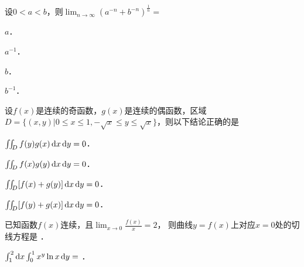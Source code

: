 \documentclass[plain,noanswer,medmath]{../../template/jnuexam}
\begin{document}






\begin{problem}
设$0 < a < b$，则$\lim_{n\to\infty}\left(a^{-n} + b^{-n}\right)^{\frac{1}{n}}=$\pickout{}
\begin{abcd}
\item $a$．
\item $a^{-1}$．
\item $b$．
\item $b^{-1}$．
\end{abcd}
\end{problem}




\begin{problem}
设$f(x)$是连续的奇函数，$g(x)$是连续的偶函数，区域\goodbreak
$D = \{(x,y)|0 \le x \le 1, - \sqrt{x} \le y \le \sqrt{x}\}$，则以下结论正确的是\pickout{}
\begin{abcd}
\item $\iint_D f(y)g(x)\mathop{}\!\mathrm{d} x\mathop{}\!\mathrm{d} y = 0$．
\item $\iint_D f(x)g(y)\mathop{}\!\mathrm{d} x\mathop{}\!\mathrm{d} y = 0$．
\item $\iint_D [f(x) + g(y)]\mathop{}\!\mathrm{d} x\mathop{}\!\mathrm{d} y = 0$．
\item $\iint_D [f(y) + g(x)]\mathop{}\!\mathrm{d} x\mathop{}\!\mathrm{d} y = 0$．
\end{abcd}
\end{problem}
















\begin{problem}
已知函数$f(x)$连续，且$\lim_{x \to 0} \frac{f(x)}{x} = 2$，
则曲线$y = f(x)$上对应$x = 0$处的切线方程是 \fillin{}．
\end{problem}


\begin{problem}
$\int_1^2 \mathop{}\!\mathrm{d} x \int_0^1 x^y\ln x\mathop{}\!\mathrm{d} y =$ \fillin{}．
\end{problem}
\end{document}
